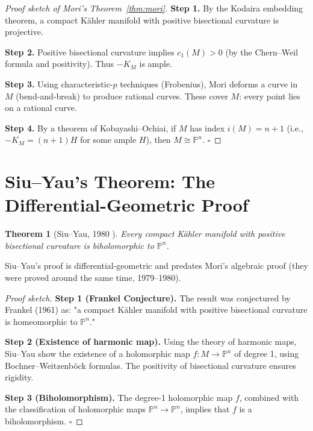 \documentclass[12pt,a4paper]{amsart}
\newtheorem{theorem}{Theorem}[section]
\theoremstyle{definition}
\theoremstyle{remark}
\newcommand{\PP}{\mathbb{P}}
\begin{document}
\begin{proof}[Proof sketch of Mori's Theorem~\ref{thm:mori}]
\textbf{Step 1.}  By the Kodaira embedding theorem, a compact Kähler manifold
with positive bisectional curvature is projective.

\textbf{Step 2.}  Positive bisectional curvature implies
$c_1(M) > 0$ (by the Chern--Weil formula and positivity).  Thus
$-K_M$ is ample.

\textbf{Step 3.}  Using characteristic-$p$ techniques (Frobenius), Mori
deforms a curve in $M$ (bend-and-break) to produce rational curves.
These cover $M$: every point lies on a rational curve.

\textbf{Step 4.}  By a theorem of Kobayashi--Ochiai, if $M$ has index
$i(M) = n+1$ (i.e., $-K_M = (n+1)H$ for some ample $H$), then
$M \cong \PP^n$. $\square$
\end{proof}

\section{Siu--Yau's Theorem: The Differential-Geometric Proof}

\begin{theorem}[Siu--Yau, 1980 \cite{SiuYau1980}]
\label{thm:siuyau}
Every compact Kähler manifold with positive bisectional curvature is
biholomorphic to $\PP^n$.
\end{theorem}

Siu--Yau's proof is differential-geometric and predates Mori's algebraic
proof (they were proved around the same time, 1979--1980).

\begin{proof}[Proof sketch]
\textbf{Step 1 (Frankel Conjecture).}  The result was conjectured by Frankel
(1961) as: "a compact Kähler manifold with positive bisectional curvature is
homeomorphic to $\PP^n$."

\textbf{Step 2 (Existence of harmonic map).}  Using the theory of harmonic
maps, Siu--Yau show the existence of a holomorphic map
$f \colon M \to \PP^n$ of degree 1, using Bochner--Weitzenböck formulas.
The positivity of bisectional curvature ensures rigidity.

\textbf{Step 3 (Biholomorphism).}  The degree-1 holomorphic map $f$, combined
with the classification of holomorphic maps $\PP^n \to \PP^n$, implies that
$f$ is a biholomorphism. $\square$
\end{proof}
\end{document}
